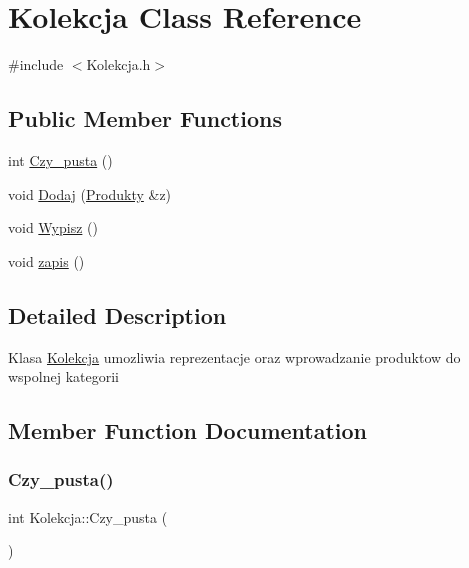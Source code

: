 \hypertarget{class_kolekcja}{}\section{Kolekcja Class Reference}
\label{class_kolekcja}


{\ttfamily \#include $<$Kolekcja.\+h$>$}

\subsection*{Public Member Functions}
\begin{DoxyCompactItemize}
\item 
int \mbox{\hyperlink{class_kolekcja_ade81cbf8bb9e0251cd8cb217eca813e4}{Czy\+\_\+pusta}} ()
\item 
void \mbox{\hyperlink{class_kolekcja_a8631b63e89e8b0b4761aa888297e9f4a}{Dodaj}} (\mbox{\hyperlink{class_produkty}{Produkty}} \&z)
\item 
void \mbox{\hyperlink{class_kolekcja_af76172e2b430490eaea2b2f553a598a6}{Wypisz}} ()
\item 
void \mbox{\hyperlink{class_kolekcja_adb7f74fefe7f8713fbececd03a3740d0}{zapis}} ()
\end{DoxyCompactItemize}


\subsection{Detailed Description}
Klasa \mbox{\hyperlink{class_kolekcja}{Kolekcja}} umozliwia reprezentacje oraz wprowadzanie produktow do wspolnej kategorii 

\subsection{Member Function Documentation}
\mbox{\label{class_kolekcja_ade81cbf8bb9e0251cd8cb217eca813e4}} 
\subsubsection{\texorpdfstring{Czy\+\_\+pusta()}{Czy\_pusta()}}
{\footnotesize\ttfamily int Kolekcja\+::\+Czy\+\_\+pusta (\begin{DoxyParamCaption}{ }\end{DoxyParamCaption})}


